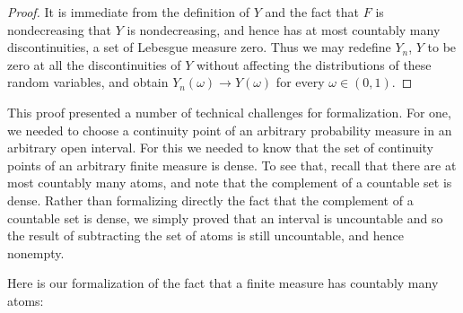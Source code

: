 \documentclass[leqno]{article}
\theoremstyle{definition}
\begin{document}
\begin{proof}
It is immediate from the definition of $Y$ and the fact that $F$ is nondecreasing that $Y$ is nondecreasing, and hence has at most countably many discontinuities, a set of Lebesgue measure zero. Thus we may redefine $Y_n$, $Y$ to be zero at all the discontinuities of $Y$ without affecting the distributions of these random variables, and obtain $Y_n(\omega) \rightarrow Y(\omega)$ for every $\omega \in (0,1)$.
\end{proof}

This proof presented a number of technical challenges for formalization. For one, we needed to choose a continuity point of an arbitrary probability measure in an arbitrary  open interval. For this we needed to know that the set of continuity points of an arbitrary finite measure is dense. To see that, recall that there are at most countably many atoms, and note that the complement of a countable set is dense. Rather than formalizing directly the fact that the complement of a countable set is dense, we simply proved that an interval is uncountable and so the result of subtracting the set of atoms is still uncountable, and hence nonempty.

Here is our formalization of the fact that a finite measure has countably many atoms:

\medskip
\end{document}
